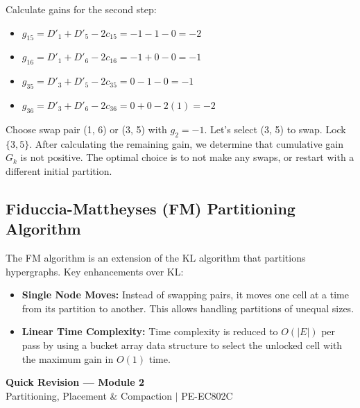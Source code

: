\documentclass[12pt,a4paper]{article}
\begin{document}
\begin{tcolorbox}[examplebox, title={Kernighan-Lin Step-by-Step Example}]
Calculate gains for the second step:
\begin{itemize}[leftmargin=*, itemsep=1pt]
  \item $g_{15} = D'_1 + D'_5 - 2c_{15} = -1 - 1 - 0 = -2$
  \item $g_{16} = D'_1 + D'_6 - 2c_{16} = -1 + 0 - 0 = -1$
  \item $g_{35} = D'_3 + D'_5 - 2c_{35} = 0 - 1 - 0 = -1$
  \item $g_{36} = D'_3 + D'_6 - 2c_{36} = 0 + 0 - 2(1) = -2$
\end{itemize}
Choose swap pair (1, 6) or (3, 5) with $g_2 = -1$.
Let's select (3, 5) to swap. Lock $\{3, 5\}$.
After calculating the remaining gain, we determine that cumulative gain $G_k$ is not positive. The optimal choice is to not make any swaps, or restart with a different initial partition.
\end{tcolorbox}

\subsection{Fiduccia-Mattheyses (FM) Partitioning Algorithm}
The FM algorithm is an extension of the KL algorithm that partitions hypergraphs.
Key enhancements over KL:
\begin{itemize}[leftmargin=*, itemsep=2pt]
  \item \textbf{Single Node Moves:} Instead of swapping pairs, it moves one cell at a time from its partition to another. This allows handling partitions of unequal sizes.
  \item \textbf{Linear Time Complexity:} Time complexity is reduced to $O(|E|)$ per pass by using a bucket array data structure to select the unlocked cell with the maximum gain in $O(1)$ time.
\end{itemize}

\newpage

\begin{center}
  {\large\bfseries\color{myred} Quick Revision — Module 2}\\[3pt]
  {\small\color{mydark} Partitioning, Placement \& Compaction $|$ PE-EC802C}
\end{center}
\noindent{\color{myred}\rule{\linewidth}{1.2pt}}
\vspace{8pt}
\end{document}
